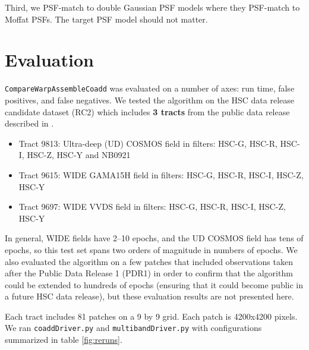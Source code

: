 \documentclass[DM,authoryear,toc]{lsstdoc}
\begin{document}
Third, we PSF-match to double Gaussian PSF models where they PSF-match to Moffat PSFs.
The target PSF model should not matter.


\section{Evaluation}
\label{sec:evaluation}

\texttt{CompareWarpAssembleCoadd} was evaluated on a number of axes: run time, false positives, and false negatives.
We tested the algorithm on the HSC data release candidate dataset (RC2) which includes \textbf{3 tracts} from the public data release  described in \citet{Bosch2018}.

\begin{itemize}
\item Tract 9813: Ultra-deep (UD) COSMOS field  in filters: HSC-G, HSC-R, HSC-I, HSC-Z, HSC-Y and NB0921
\item Tract 9615: WIDE GAMA15H field  in filters: HSC-G, HSC-R, HSC-I, HSC-Z, HSC-Y
\item Tract 9697: WIDE VVDS field  in filters: HSC-G, HSC-R, HSC-I, HSC-Z, HSC-Y
\end{itemize}

In general, WIDE fields have 2--10 epochs, and the UD COSMOS field has tens of epochs, so this test set spans two orders of magnitude in numbers of epochs.
We also evaluated the algorithm on a few patches that included observations taken after the Public Data Release 1 (PDR1) in order to confirm that the algorithm could be extended to hundreds of epochs (ensuring that it could become public in a future HSC data release), but these evaluation results are not presented here.

Each tract includes 81 patches on a 9 by 9 grid.  Each patch is 4200x4200 pixels. We ran \texttt{coaddDriver.py} and \texttt{multibandDriver.py} with configurations summarized in table \ref{fig:reruns}.
\end{document}
